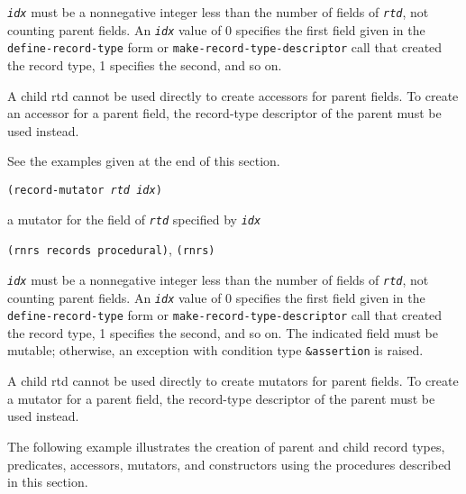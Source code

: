 \texttt{\textit{idx}} must be a nonnegative integer less than the number of fields of
\texttt{\textit{rtd}}, not counting parent fields.
An \texttt{\textit{idx}} value of 0 specifies the first field given in the
\texttt{define-record-type} form or \texttt{make-record-type-descriptor}
call that created the record type, 1 specifies the second, and so on.

A child rtd cannot be used directly to create accessors for parent fields.
To create an accessor for a parent field, the record-type descriptor of
the parent must be used instead.


See the examples given at the end of this section.


\begin{description}

\label{records_s32}\item[procedure] \texttt{(record-mutator \textit{rtd} \textit{idx})}



\item[returns] a mutator for the field of \texttt{\textit{rtd}} specified by \texttt{\textit{idx}}


\item[libraries] \texttt{(rnrs records procedural)}, \texttt{(rnrs)}
\end{description}

\texttt{\textit{idx}} must be a nonnegative integer less than the number of fields of
\texttt{\textit{rtd}}, not counting parent fields.
An \texttt{\textit{idx}} value of 0 specifies the first field given in the
\texttt{define-record-type} form or \texttt{make-record-type-descriptor}
call that created the record type, 1 specifies the second, and so on.
The indicated field must be mutable; otherwise, an exception with condition
type \texttt{\&{}assertion} is raised.

A child rtd cannot be used directly to create mutators for parent fields.
To create a mutator for a parent field, the record-type descriptor of
the parent must be used instead.



The following example illustrates the creation of parent and child record
types, predicates, accessors, mutators, and constructors using the procedures
described in this section.


